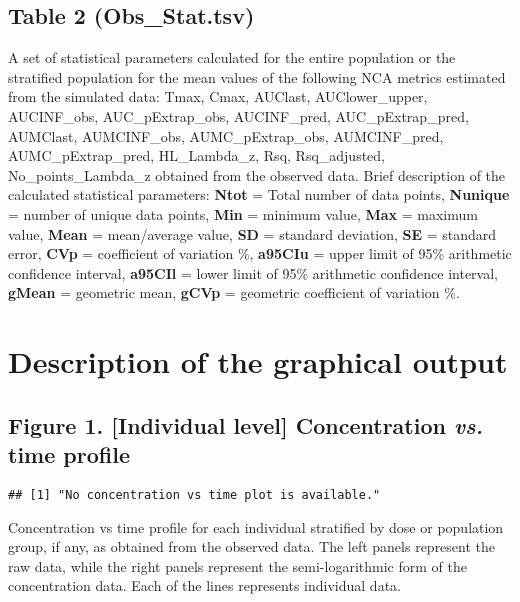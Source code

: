 \documentclass[pdflatex, a4paper, 11pt]{article}\usepackage[]{graphicx}\usepackage[]{color}
\makeatletter
\newenvironment{kframe}{%
 \def\at@end@of@kframe{}%
 \ifinner\ifhmode%
  \def\at@end@of@kframe{\end{minipage}}%
  \begin{minipage}{\columnwidth}%
 \fi\fi%
 \def\FrameCommand##1{\hskip\@totalleftmargin \hskip-\fboxsep
 \colorbox{shadecolor}{##1}\hskip-\fboxsep
     \hskip-\linewidth \hskip-\@totalleftmargin \hskip\columnwidth}%
 \MakeFramed {\advance\hsize-\width
   \@totalleftmargin\z@ \linewidth\hsize
   \@setminipage}}%
 {\par\unskip\endMakeFramed%
 \at@end@of@kframe}
\newenvironment{knitrout}{}{} %
\numberwithin{equation}{section}
\numberwithin{figure}{section}
\numberwithin{table}{section}
\makeatother
\begin{document}
\begin{sloppypar}
\subsection{Table 2 (Obs\_Stat.tsv)}
A set of statistical parameters calculated for the entire population or the stratified population for the mean values of the following NCA metrics estimated from the simulated data: Tmax, Cmax, AUClast, AUClower\_upper, AUCINF\_obs, AUC\_pExtrap\_obs, AUCINF\_pred, AUC\_pExtrap\_pred, AUMClast, AUMCINF\_obs, AUMC\_pExtrap\_obs, AUMCINF\_pred, AUMC\_pExtrap\_pred, HL\_Lambda\_z, Rsq, Rsq\_adjusted, No\_points\_Lambda\_z obtained from the observed data. Brief description of the calculated statistical parameters: \textbf{Ntot} = Total number of data points, \textbf{Nunique} = number of unique data points, \textbf{Min} = minimum value, \textbf{Max} = maximum value, \textbf{Mean} = mean/average value, \textbf{SD} = standard deviation, \textbf{SE} = standard error, \textbf{CVp} = coefficient of variation \%, \textbf{a95CIu} = upper limit of 95\% arithmetic confidence interval, \textbf{a95CIl} = lower limit of 95\% arithmetic confidence interval, \textbf{gMean} = geometric mean, \textbf{gCVp} = geometric coefficient of variation \%.

\newpage
\section{Description of the graphical output}

\subsection{Figure 1. [Individual level] Concentration \textit{vs.} time profile}
\begin{knitrout}
\color{fgcolor}\begin{kframe}
\begin{lstlisting}[basicstyle=\ttfamily,breaklines=true]
## [1] "No concentration vs time plot is available."
\end{lstlisting}
\end{kframe}
\end{knitrout}

Concentration vs time profile for each individual stratified by dose or population group, if any, as obtained from the observed data. The left panels represent the raw data, while the right panels represent the semi-logarithmic form of the concentration data. Each of the lines represents individual data.


\end{sloppypar}
\end{document}
